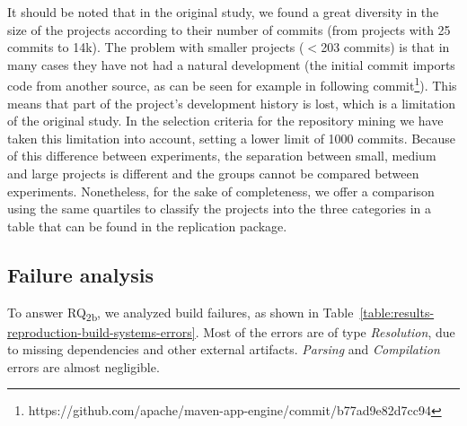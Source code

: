 It should be noted that in the original study, we found a great diversity in the size of the projects according to their number of commits (from projects with 25 commits to 14k).
The problem with smaller projects ($<$203 commits) is that in many cases they have not had a natural development (the initial commit imports code from another source, as can be seen for example in following commit\footnote{https://github.com/apache/maven-app-engine/commit/b77ad9e82d7cc94}).
This means that part of the project's development history is lost, which is a limitation of the original study.
In the selection criteria for the repository mining we have taken this limitation into account, setting a lower limit of 1000 commits.
Because of this difference between experiments, the separation between small, medium and large projects is different and the groups cannot be compared between experiments. 
Nonetheless, for the sake of completeness, we offer a comparison using the same quartiles to classify the projects into the three categories in a table that can be found in the replication package.

\vspace{0.2cm}

\subsection{Failure analysis}

To answer RQ\textsubscript{2b}, we analyzed build failures, as shown in Table~\ref{table:results-reproduction-build-systems-errors}. Most of the errors are of type \textit{Resolution}, due to missing dependencies and other external artifacts. \textit{Parsing} and \textit{Compilation} errors are almost negligible.

